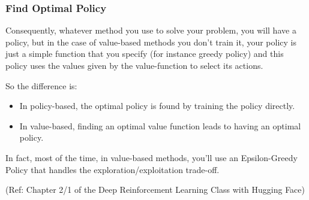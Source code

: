 \begin{frame}[fragile]\frametitle{Find Optimal Policy}

Consequently, whatever method you use to solve your problem, you will have a policy, but in the case of value-based methods you don't train it, your policy is just a simple function that you specify (for instance greedy policy) and this policy uses the values given by the value-function to select its actions.

So the difference is:
\begin{itemize}
\item In policy-based, the optimal policy is found by training the policy directly.
\item In value-based, finding an optimal value function leads to having an optimal policy.
\end{itemize}

In fact, most of the time, in value-based methods, you'll use an Epsilon-Greedy Policy that handles the exploration/exploitation trade-off.

{\tiny (Ref: Chapter 2/1 of the Deep Reinforcement Learning Class with Hugging Face)}


\end{frame}


